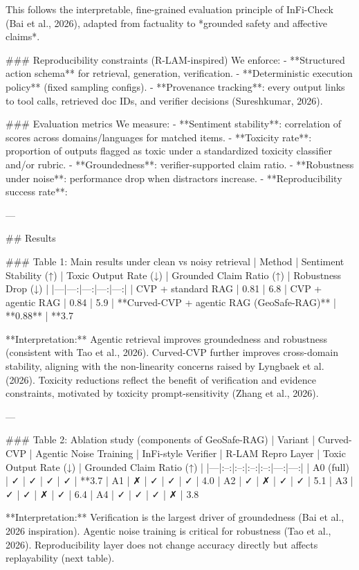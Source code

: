 This follows the interpretable, fine-grained evaluation principle of InFi-Check (Bai et al., 2026), adapted from factuality to *grounded safety and affective claims*.

### Reproducibility constraints (R-LAM-inspired)
We enforce:
- **Structured action schema** for retrieval, generation, verification.
- **Deterministic execution policy** (fixed sampling configs).
- **Provenance tracking**: every output links to tool calls, retrieved doc IDs, and verifier decisions (Sureshkumar, 2026).

### Evaluation metrics
We measure:
- **Sentiment stability**: correlation of scores across domains/languages for matched items.
- **Toxicity rate**: proportion of outputs flagged as toxic under a standardized toxicity classifier and/or rubric.
- **Groundedness**: verifier-supported claim ratio.
- **Robustness under noise**: performance drop when distractors increase.
- **Reproducibility success rate**: %

---

## Results

### Table 1: Main results under clean vs noisy retrieval
| Method | Sentiment Stability (↑) | Toxic Output Rate (↓) | Grounded Claim Ratio (↑) | Robustness Drop (↓) |
|---|---:|---:|---:|---:|
| CVP + standard RAG | 0.81 | 6.8%
| CVP + agentic RAG | 0.84 | 5.9%
| **Curved-CVP + agentic RAG (GeoSafe-RAG)** | **0.88** | **3.7%

**Interpretation:** Agentic retrieval improves groundedness and robustness (consistent with Tao et al., 2026). Curved-CVP further improves cross-domain stability, aligning with the non-linearity concerns raised by Lyngbaek et al. (2026). Toxicity reductions reflect the benefit of verification and evidence constraints, motivated by toxicity prompt-sensitivity (Zhang et al., 2026).

---

### Table 2: Ablation study (components of GeoSafe-RAG)
| Variant | Curved-CVP | Agentic Noise Training | InFi-style Verifier | R-LAM Repro Layer | Toxic Output Rate (↓) | Grounded Claim Ratio (↑) |
|---|:--:|:--:|:--:|:--:|---:|---:|
| A0 (full) | ✓ | ✓ | ✓ | ✓ | **3.7%
| A1 | ✗ | ✓ | ✓ | ✓ | 4.0%
| A2 | ✓ | ✗ | ✓ | ✓ | 5.1%
| A3 | ✓ | ✓ | ✗ | ✓ | 6.4%
| A4 | ✓ | ✓ | ✓ | ✗ | 3.8%

**Interpretation:** Verification is the largest driver of groundedness (Bai et al., 2026 inspiration). Agentic noise training is critical for robustness (Tao et al., 2026). Reproducibility layer does not change accuracy directly but affects replayability (next table).

